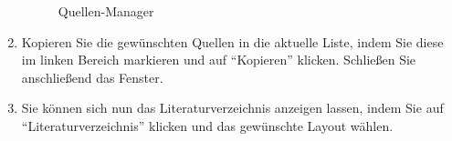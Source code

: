 \begin{enumerate}
\begin{figure}[h!]
 \label{fig:reiterVerweise}
\end{figure}
\begin{figure}[h!]
 \centering
 \caption{Quellen-Manager}
 \label{fig:quellenManager}
\end{figure} 
    \item Kopieren Sie die gewünschten Quellen in die aktuelle Liste, indem Sie diese im linken Bereich markieren und auf \enquote{Kopieren} klicken. Schließen Sie anschließend das Fenster.
    \item Sie können sich nun das Literaturverzeichnis anzeigen lassen, indem Sie auf \enquote{Literaturverzeichnis} klicken und das gewünschte Layout wählen.
\end{enumerate}
